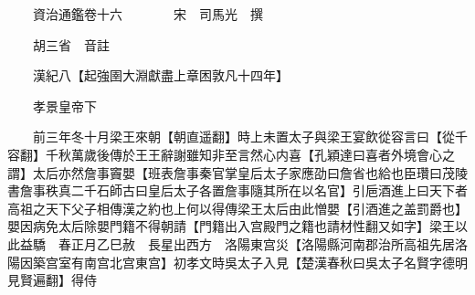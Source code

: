 










 


 
 


 

  
  
  
  
  





  
  
  
  
  
 
  

  

  
  
  



  

 
 

  
   




  

  
  


  　　資治通鑑卷十六　　　　宋　司馬光　撰

　　胡三省　音註

　　漢紀八【起強圉大淵獻盡上章困敦凡十四年】

　　孝景皇帝下

　　前三年冬十月梁王來朝【朝直遥翻】時上未置太子與梁王宴飲從容言曰【從千容翻】千秋萬歲後傳於王王辭謝雖知非至言然心内喜【孔穎達曰喜者外境會心之謂】太后亦然詹事竇嬰【班表詹事秦官掌皇后太子家應劭曰詹省也給也臣瓚曰茂陵書詹事秩真二千石師古曰皇后太子各置詹事隨其所在以名官】引巵酒進上曰天下者高祖之天下父子相傳漢之約也上何以得傳梁王太后由此憎嬰【引酒進之盖罰爵也】嬰因病免太后除嬰門籍不得朝請【門籍出入宫殿門之籍也請材性翻又如字】梁王以此益驕　春正月乙巳赦　長星出西方　洛陽東宫災【洛陽縣河南郡治所高祖先居洛陽因築宫室有南宫北宫東宫】初孝文時吳太子入見【楚漢春秋曰吳太子名賢字德明見賢遍翻】得侍

